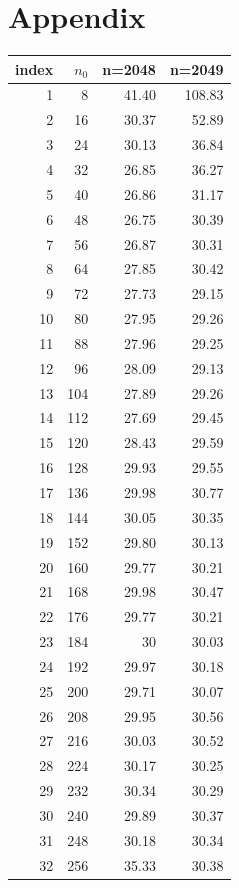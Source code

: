 \documentclass[a4paper, 11pt]{article}
\begin{document}
 
\section*{Appendix}
\begin{table}[ht]
	\centering
	\begin{tabular}{rrrr}
		\hline
		index& $n_0$ & n=2048 & n=2049 \\ 
		\hline
		1 & 8 & 41.40 & 108.83 \\ 
		2 & 16 & 30.37 & 52.89 \\ 
		3 & 24 & 30.13 & 36.84 \\ 
		4 & 32 & 26.85 & 36.27 \\ 
		5 & 40 & 26.86 & 31.17 \\ 
		6 & 48 & 26.75 & 30.39 \\ 
		7 & 56 & 26.87 & 30.31 \\ 
		8 & 64 & 27.85 & 30.42 \\ 
		9 & 72 & 27.73 & 29.15 \\ 
		10 & 80 & 27.95 & 29.26 \\ 
		11 & 88 & 27.96 & 29.25 \\ 
		12 & 96 & 28.09 & 29.13 \\ 
		13 & 104 & 27.89 & 29.26 \\ 
		14 & 112 & 27.69 & 29.45 \\ 
		15 & 120 & 28.43 & 29.59 \\ 
		16 & 128 & 29.93 & 29.55 \\ 
		17 & 136 & 29.98 & 30.77 \\ 
		18 & 144 & 30.05 & 30.35 \\ 
		19 & 152 & 29.80 & 30.13 \\ 
		20 & 160 & 29.77 & 30.21 \\ 
		21 & 168 & 29.98 & 30.47 \\ 
		22 & 176 & 29.77 & 30.21 \\ 
		23 & 184 & 30 & 30.03 \\ 
		24 & 192 & 29.97 & 30.18 \\ 
		25 & 200 & 29.71 & 30.07 \\ 
		26 & 208 & 29.95 & 30.56 \\ 
		27 & 216 & 30.03 & 30.52 \\ 
		28 & 224 & 30.17 & 30.25 \\ 
		29 & 232 & 30.34 & 30.29 \\ 
		30 & 240 & 29.89 & 30.37 \\ 
		31 & 248 & 30.18 & 30.34 \\ 
		32 & 256 & 35.33 & 30.38 \\ 

\end{tabular}
\end{table}
\end{document}
